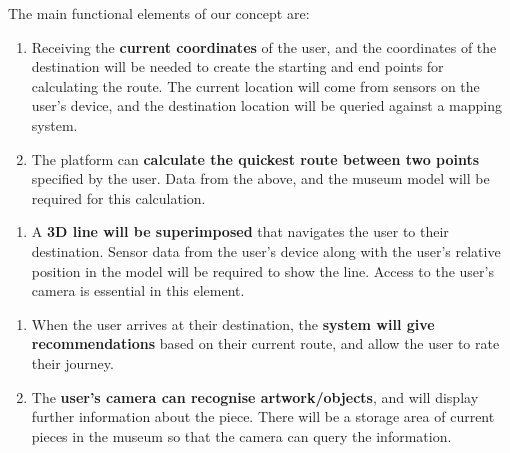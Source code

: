 
The main functional elements of our concept are:

\begin{enumerate}
    \item Receiving the \textbf{current coordinates} of the user, and the coordinates of the destination will be needed to create the starting and end points for calculating the route. The current location will come from sensors on the user's device, and the destination location will be queried against a mapping system.
    \item The platform can \textbf{calculate the quickest route between two points} specified by the user. Data from the above, and the museum model will be required for this calculation.
\end{enumerate}
\begin{enumerate}
    \item A \textbf{3D line will be superimposed} that navigates the user to their destination. Sensor data from the user's device along with the user's relative position in the model will be required to show the line. Access to the user's camera is essential in this element.
\end{enumerate}
\begin{enumerate}
    \item When the user arrives at their destination, the \textbf{system will give recommendations} based on their current route, and allow the user to rate their journey.
    \item The \textbf{user's camera can recognise artwork/objects}, and will display further information about the piece. There will be a storage area of current pieces in the museum so that the camera can query the information.
\end{enumerate}
